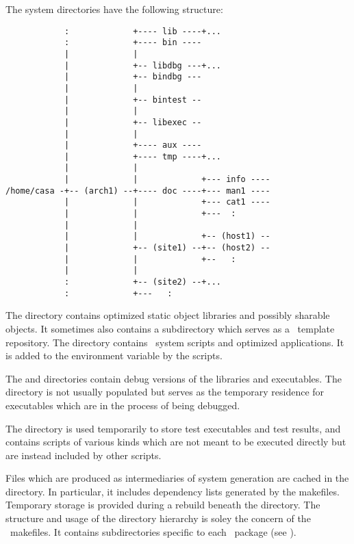The system directories have the following structure:

\begin{verbatim}
            :             +---- lib ----+...
            :             +---- bin ----
            |             |
            |             +-- libdbg ---+...
            |             +-- bindbg ---
            |             |
            |             +-- bintest --
            |             |
            |             +-- libexec --
            |             |
            |             +---- aux ----
            |             +---- tmp ----+...
            |             |
            |             |             +--- info ----
/home/casa -+-- (arch1) --+---- doc ----+--- man1 ----
            |             |             +--- cat1 ----
            |             |             +---  :
            |             |
            |             |             +-- (host1) --
            |             +-- (site1) --+-- (host2) --
            |             |             +--   :
            |             |
            :             +-- (site2) --+...
            :             +---   :
\end{verbatim}

\noindent
The  directory contains optimized static object libraries and
possibly sharable objects.  It sometimes also contains a subdirectory which
serves as a \cplusplus\ template repository.  The  directory
contains \casa\ system scripts and optimized applications.  It is added to
the  environment variable by the  scripts.

The  and  directories contain debug versions of the
libraries and executables.  The  directory is not usually
populated but serves as the temporary residence for executables which are in
the process of being debugged.

The  directory is used temporarily to store test executables and
test results, and  contains scripts of various kinds which are
not meant to be executed directly but are instead included by other scripts.

Files which are produced as intermediaries of system generation are cached in
the  directory.  In particular, it includes dependency lists
generated by the makefiles.  Temporary storage is provided during a rebuild
beneath the  directory.  The structure and usage of the 
directory hierarchy is soley the concern of the \casa\ makefiles.  It
contains subdirectories specific to each \casa\ package (see
).

